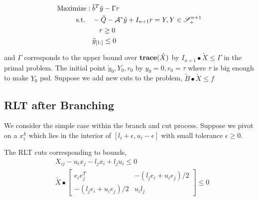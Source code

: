 \documentclass[../main]{subfiles}
\begin{document}
\begin{equation}
    \begin{aligned}
        \mathrm{Maximize:\;}           & \tilde b^T \tilde y-\Gamma r                                                \\
        \mathrm{s.t.} \quad & - \tilde{Q}-\mathcal{A}^{*} \tilde y+I_{n+1} r= Y, Y \in \mathscr S^{n+1}_+ \\
                            & \quad r \ge 0                                                               \\
                            & \tilde y_{[1:]} \le 0
    \end{aligned}
\end{equation}

and \(\Gamma\) corresponds to the upper bound over \(\mathbf{trace}(\tilde X)\) by \(I_{n+1} \bullet \tilde X \le \Gamma\) in the primal problem. The initial point \(\tilde y_0, Y_0, r_0\) by \(y_0 = 0, r_0 = \tau\) where \(\tau\) is big enough to make \(Y_0\) psd.
Suppose we add new cuts to the problem, \(\tilde B \bullet \tilde X  \le f \)

\subsection{RLT after Branching}
We consider the simple case within the branch and cut process. Suppose we pivot on a \(x_i^k\) which lies in the interior of \(\left[l_i + \epsilon, u_i -\epsilon\right]\) with small tolerance \(\epsilon \ge 0\).

The RLT cuts corresponding to bounds,
\begin{align}
    \label{eq:ws.rlt.left} & X_{ij} - u_i x_j - l_j x_i + l_j u_i \le 0        \\
    \label{eq:ws.rlt.mat}  & \tilde X \bullet \begin{bmatrix}
        e_ie_j^T                  & - (l_j e_i + u_i e_j) / 2 \\
        - (l_j e_i + u_i e_j) / 2 & u_i l_j
    \end{bmatrix} \le 0
\end{align}
\end{document}

